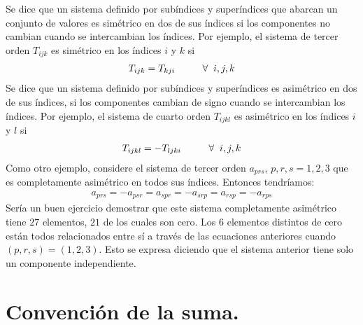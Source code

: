 Se dice que un sistema definido por subíndices y superíndices que abarcan un conjunto de valores es simétrico en dos de sus índices si los componentes no cambian cuando se intercambian los índices. Por ejemplo, el sistema de tercer orden $T_{ijk}$ es simétrico en los índices $i$ y $k$ si
\begin{align*}
T_{ijk} = T_{kji} \hspace{1cm} \forall \hspace{0.2cm} i, j, k
\end{align*}
Se dice que un sistema definido por subíndices y superíndices es asimétrico en dos de sus índices, si los componentes cambian de signo cuando se intercambian los índices. Por ejemplo, el sistema de cuarto orden $T_{ijkl}$ es asimétrico en los índices $i$ y $l$ si
\begin{align*}
T_{ijkl} = -T_{ljki} \hspace{1cm} \forall \hspace{0.2cm} i, j, k
\end{align*}
Como otro ejemplo, considere el sistema de tercer orden $a_{prs}$, $p, r, s = 1, 2, 3$ que es completamente asimétrico en todos sus índices. Entonces tendríamos:
\begin{align*}
a_{prs} = - a_{psr} = a_{spr} = -a_{srp} = a_{rsp} = -a_{rps}
\end{align*}
Sería un buen ejercicio demostrar que este sistema completamente asimétrico tiene $27$ elementos, $21$ de los cuales son cero. Los $6$ elementos distintos de cero están todos relacionados entre sí a través de las ecuaciones anteriores cuando $(p, r, s) = (1, 2, 3)$. Esto se expresa diciendo que el sistema anterior tiene solo un componente independiente.

\section{Convención de la suma.}

